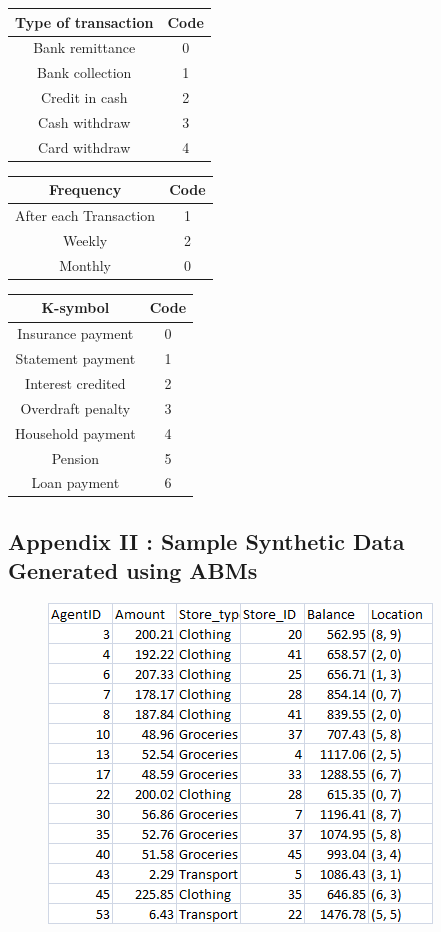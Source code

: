 \documentclass[]{article}
\begin{document}
\begin{longtable}[]{@{}cc@{}}
\toprule
Type of transaction & Code\tabularnewline
\midrule
\endhead
Bank remittance & 0\tabularnewline
Bank collection & 1\tabularnewline
Credit in cash & 2\tabularnewline
Cash withdraw & 3\tabularnewline
Card withdraw & 4\tabularnewline
\bottomrule
\end{longtable}

\begin{longtable}[]{@{}cc@{}}
\toprule
Frequency & Code\tabularnewline
\midrule
\endhead
After each Transaction & 1\tabularnewline
Weekly & 2\tabularnewline
Monthly & 0\tabularnewline
\bottomrule
\end{longtable}

\begin{longtable}[]{@{}cc@{}}
\toprule
K-symbol & Code\tabularnewline
\midrule
\endhead
Insurance payment & 0\tabularnewline
Statement payment & 1\tabularnewline
Interest credited & 2\tabularnewline
Overdraft penalty & 3\tabularnewline
Household payment & 4\tabularnewline
Pension & 5\tabularnewline
Loan payment & 6\tabularnewline
\bottomrule
\end{longtable}

\subsection{Appendix II : Sample Synthetic Data Generated using
ABMs}\label{appendix-ii-sample-synthetic-data-generated-using-abms}

\begin{figure}
\centering
\includegraphics{uploads/upload_22258fd69d3fe4f27d9cd3a423fc7650.png}
\caption{}
\end{figure}
\end{document}
